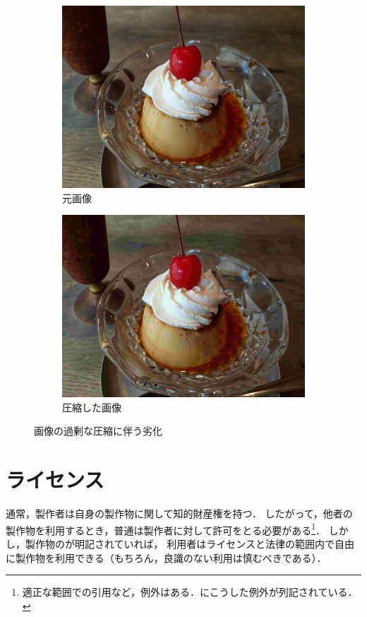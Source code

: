 \documentclass[../../index]{subfiles}
\begin{document}
\begin{figure}[htbp]
  \centering
  \begin{subfigure}{0.5\linewidth}
    \centering
    \includegraphics[width=\smallfiguresize]{pudding.jpeg}
    \caption{元画像}
  \end{subfigure}%
  \begin{subfigure}{0.5\linewidth}
    \centering
    \includegraphics[width=\smallfiguresize]{worse.jpeg}
    \caption{圧縮した画像}
  \end{subfigure}
  \caption{画像の過剰な圧縮に伴う劣化}
  \label{figure:image_compression}
\end{figure}

\section{ライセンス}
通常，製作者は自身の製作物に関して知的財産権を持つ．
したがって，他者の製作物を利用するとき，普通は製作者に対して許可をとる必要がある\footnote{適正な範囲での引用など，例外はある．\cite{bunka}にこうした例外が列記されている．}．
しかし，製作物のが明記されていれば，
利用者はライセンスと法律の範囲内で自由に製作物を利用できる（もちろん，良識のない利用は慎むべきである）．
\end{document}
